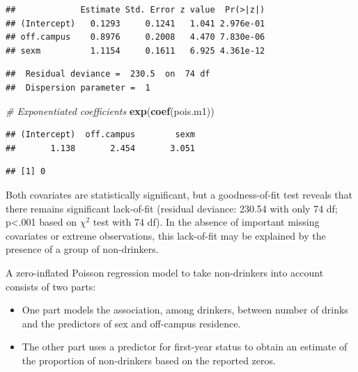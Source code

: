 \documentclass[
]{krantz}
\newenvironment{Shaded}{\begin{snugshade}}{\end{snugshade}}
\newcommand{\CommentTok}[1]{\textcolor[rgb]{0.37,0.37,0.37}{\textit{#1}}}
\newcommand{\DecValTok}[1]{\textcolor[rgb]{0.06,0.06,0.06}{#1}}
\newcommand{\FunctionTok}[1]{\textcolor[rgb]{0.27,0.27,0.27}{\textbf{#1}}}
\newcommand{\NormalTok}[1]{#1}
\newcommand{\OtherTok}[1]{\textcolor[rgb]{0.37,0.37,0.37}{#1}}
\newcommand{\SpecialCharTok}[1]{\textcolor[rgb]{0.43,0.43,0.43}{\textbf{#1}}}
\providecommand{\tightlist}{%
  \setlength{\itemsep}{0pt}\setlength{\parskip}{0pt}}
\begin{document}
\begin{verbatim}
##             Estimate Std. Error z value  Pr(>|z|)
## (Intercept)   0.1293     0.1241   1.041 2.976e-01
## off.campus    0.8976     0.2008   4.470 7.830e-06
## sexm          1.1154     0.1611   6.925 4.361e-12
\end{verbatim}

\begin{verbatim}
##  Residual deviance =  230.5  on  74 df 
##  Dispersion parameter =  1
\end{verbatim}

\begin{Shaded}
\begin{Highlighting}[]
\CommentTok{\# Exponentiated coefficients}
\FunctionTok{exp}\NormalTok{(}\FunctionTok{coef}\NormalTok{(pois.m1))}
\end{Highlighting}
\end{Shaded}

\begin{verbatim}
## (Intercept)  off.campus        sexm 
##       1.138       2.454       3.051
\end{verbatim}

\begin{Shaded}
\end{Shaded}

\begin{verbatim}
## [1] 0
\end{verbatim}

Both covariates are statistically significant, but a goodness-of-fit test reveals that there remains significant lack-of-fit (residual deviance: 230.54 with only 74 df; p\textless.001 based on \(\chi^2\) test with 74 df). In the absence of important missing covariates or extreme observations, this lack-of-fit may be explained by the presence of a group of non-drinkers.

A zero-inflated Poisson regression model to take non-drinkers into account consists of two parts:

\begin{itemize}
\tightlist
\item
  One part models the association, among drinkers, between number of drinks and the predictors of sex and off-campus residence.
\item
  The other part uses a predictor for first-year status to obtain an estimate of the proportion of non-drinkers based on the reported zeros.
\end{itemize}
\end{document}
